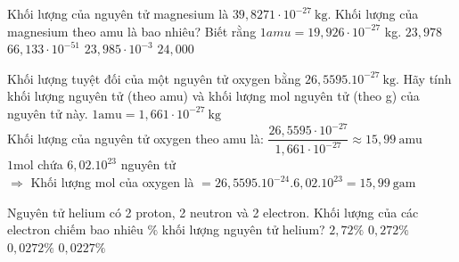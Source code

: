 \begin{vdex}
	Khối lượng của nguyên tử magnesium là $39{,}8271 \cdot 10^{-27} \mathrm{~kg}$. Khối lượng của magnesium theo amu là bao nhiêu? Biết rằng $1amu=19{,}926 \cdot 10^{-27}$ kg.
		\choice
		{\True $ 23{,}978 $}
		{$66{,}133 \cdot 10^{-51}$}
		{$23{,}985 \cdot 10^{-3}$}
		{$ 24{,}000 $}
\end{vdex}
\begin{vdex}
	Khối lượng tuyệt đối của một nguyên tử oxygen bằng $26,5595.10^{-27} \mathrm{~kg}$. Hãy tính khối lượng nguyên tử (theo amu) và khối lượng mol nguyên tử (theo g) của nguyên tử này.
	\loigiai
	{%
		$
		1 \mathrm{amu}=1,661 \cdot 10^{-27} \mathrm{~kg}
		$\\
		Khối lượng của nguyên tử oxygen theo amu là:
		$
		\dfrac{26,5595 \cdot 10^{-27}}{1,661 \cdot 10^{-27}} \approx 15,99~ \mathrm{amu}
		$\\
		$1 \mathrm{mol}$ chứa $ 6,02.10^{23} $ nguyên tử\\
		$\Rightarrow$ Khối lượng mol của oxygen là  $=26,5595.10^{-24}.6,02.10^{23}= 15,99~ \mathrm{gam} $
	}
\end{vdex}
\begin{vdex}
	Nguyên tử helium có 2 proton, 2 neutron và 2 electron. Khối lượng của các electron chiếm bao nhiêu $\%$ khối lượng nguyên tử helium?
	\choice
	{$2,72 \%$}
	{$0,272 \%$}
	{\True$0,0272 \%$}
	{$0,0227 \%$}
\end{vdex}
